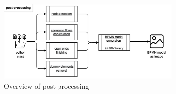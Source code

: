 
\begin{figure}[h]
    \centering
    \caption{Overview of post-processing}
    \includegraphics[width=0.8\textwidth]{tum-resources/images/theoretical_extraction_post.png}
\end{figure}
